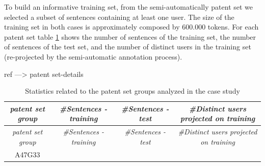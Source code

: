 \documentclass[]{book}
\begin{document}
To build an informative training set, from the semi-automatically patent
set we selected a subset of sentences containing at least one user. The
size of the training set in both cases is approximately composed by
600.000 tokens. For each patent set table \ref{tab:patentsetdetails}
shows the number of sentences of the training set, the number of
sentences of the test set, and the number of distinct users in the
training set (re-projected by the semi-automatic annotation process).

ref ---\textgreater{} patent set-details

\begin{longtable}[]{@{}cccc@{}}
\caption{\label{tab:patentsetdetails} Statistics related to the patent set
groups analyzed in the case study}\tabularnewline
\toprule
\begin{minipage}[b]{0.16\columnwidth}\centering\strut
\emph{patent set group}\strut
\end{minipage} & \begin{minipage}[b]{0.21\columnwidth}\centering\strut
\emph{\#Sentences - training}\strut
\end{minipage} & \begin{minipage}[b]{0.18\columnwidth}\centering\strut
\emph{\#Sentences - test}\strut
\end{minipage} & \begin{minipage}[b]{0.33\columnwidth}\centering\strut
\emph{\#Distinct users projected on training}\strut
\end{minipage}\tabularnewline
\midrule
\endfirsthead
\toprule
\begin{minipage}[b]{0.16\columnwidth}\centering\strut
\emph{patent set group}\strut
\end{minipage} & \begin{minipage}[b]{0.21\columnwidth}\centering\strut
\emph{\#Sentences - training}\strut
\end{minipage} & \begin{minipage}[b]{0.18\columnwidth}\centering\strut
\emph{\#Sentences - test}\strut
\end{minipage} & \begin{minipage}[b]{0.33\columnwidth}\centering\strut
\emph{\#Distinct users projected on training}\strut
\end{minipage}\tabularnewline
\midrule
\endhead
\begin{minipage}[t]{0.16\columnwidth}\centering\strut
A47G33\strut
\end{minipage} & \begin{minipage}[t]{0.21\columnwidth}\centering\strut

\end{minipage}
\end{longtable}
\end{document}
